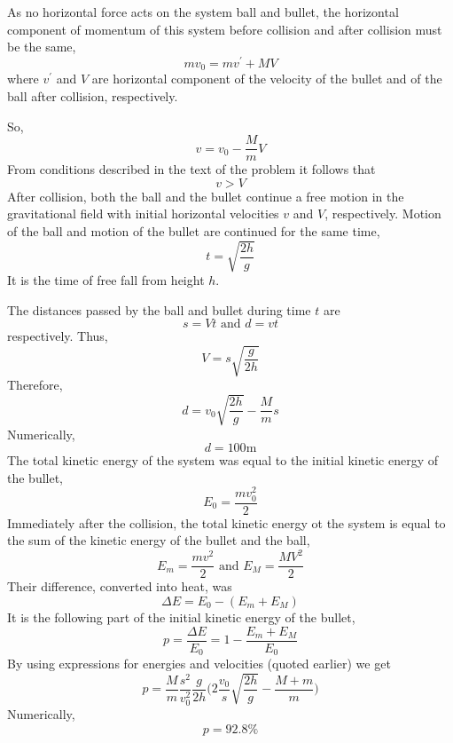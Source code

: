 \documentclass[12pt,a4paper]{book}
\begin{document}
	As no horizontal force acts on the system ball and bullet, the horizontal component of momentum of this system before collision and after collision must be the same,
	\begin{equation*}
		mv_0=mv^{'}+MV
	\end{equation*}
	where $v^{'}$ and $V$ are horizontal component of the velocity of the bullet and of the ball after collision, respectively.\par
	So,
	\begin{equation*}
		v=v_0-\frac{M}{m}V
	\end{equation*}
	From conditions described in the text of the problem it follows that
	\begin{equation*}
		v>V
	\end{equation*}
	After collision, both the ball and the bullet continue a free motion in the gravitational f\mbox{}ield with initial horizontal velocities $v$ and $V$, respectively. Motion of the ball and motion of the bullet are continued for the same time,
	\begin{equation*}
		t=\sqrt{\frac{2h}{g}}
	\end{equation*}
	It is the time of free fall from height $h$.\par
	The distances passed by the ball and bullet during time $t$ are
	\begin{equation*}
		s=Vt\text{ and }d=vt
	\end{equation*}
	respectively. Thus,
	\begin{equation*}
		V=s\sqrt{\frac{g}{2h}}
	\end{equation*}
	Therefore,
	\begin{equation}
		d=v_0\sqrt{\frac{2h}{g}}-\frac{M}{m}s
	\end{equation}
	Numerically,
	\begin{equation*}
		d=100\text{m}
	\end{equation*}
	The total kinetic energy of the system was equal to the initial kinetic energy of the bullet,
	\begin{equation*}
		E_0=\frac{mv_0^{2}}{2}
	\end{equation*}
	Immediately after the collision, the total kinetic energy ot the system is equal to the sum of the kinetic energy of the bullet and the ball,
	\begin{equation*}
		E_m=\frac{mv^{2}}{2}\text{ and }E_M=\frac{MV^{2}}{2}
	\end{equation*}
	Their dif\mbox{}ference, converted into heat, was
	\begin{equation*}
		\Delta E=E_0-(E_m+E_M)
	\end{equation*}
	It is the following part of the initial kinetic energy of the bullet,
	\begin{equation*}
		p=\frac{\Delta E}{E_0}=1-\frac{E_m+E_M}{E_0}
	\end{equation*}
	By using expressions for energies and velocities (quoted earlier) we get
	\begin{equation}
		p=\frac{M}{m}\frac{s^2}{v_0^2}\frac{g}{2h}\Big(2\frac{v_0}{s}\sqrt{\frac{2h}{g}}-\frac{M+m}{m}\Big)
	\end{equation}
	Numerically,
	\begin{equation*}
		p=92.8\text{\%}
	\end{equation*}
\end{document}
